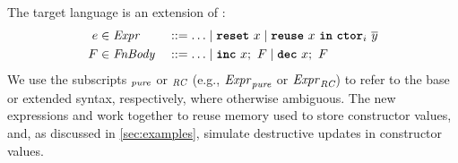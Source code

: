 \documentclass[sigconf]{acmart}
\begin{document}
The target language \rcIR{} is an extension of \pureIR{}:
\begin{alignat*}{3}
  e \syncat{Expr} &&::= \ldots \mid \Reset x \mid \Reuse_i x \many{y} \\
  F \syncat{FnBody} &&::= \ldots \mid \Inc x; F \mid \Dec x; F
\end{alignat*}
We use the subscripts $_{\textit{pure}}$ or $_{\textit{RC}}$ (e.g., $\mathit{Expr}_{\textit{pure}}$ or $\mathit{Expr}_{\textit{RC}}$) to refer to the base or
extended syntax, respectively, where otherwise ambiguous.
The new expressions  and  work together to reuse memory used
to store constructor values, and, as discussed in \cref{sec:examples}, simulate
destructive updates in constructor values.

\end{document}
